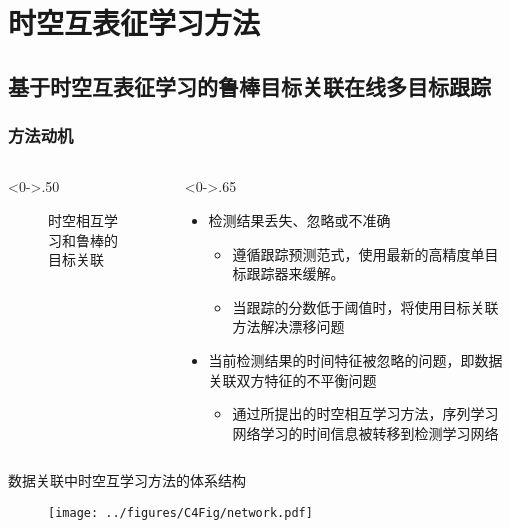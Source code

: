 \section{时空互表征学习方法}
\subsection{基于时空互表征学习的鲁棒目标关联在线多目标跟踪}


\begin{frame}
	\frametitle{方法动机}
	\begin{columns}[T] %
		\begin{column}<0->{.50\textwidth}
			\begin{figure}[thpb]
				\centering
				\caption{时空相互学习和鲁棒的目标关联}
			\end{figure}
		\end{column}
		\hfill%
		\begin{column}<0->{.65\textwidth}
			\begin{itemize}
				\item<1-> 检测结果丢失、忽略或不准确
				\begin{itemize}
					\item<1-> 遵循跟踪预测范式，使用最新的高精度单目标跟踪器来缓解。
					\item<1-> 当跟踪的分数低于阈值时，将使用目标关联方法解决漂移问题
				\end{itemize}
				\item<1-> 当前检测结果的时间特征被忽略的问题，即数据关联双方特征的不平衡问题
				\begin{itemize}
					\item<1-> 通过所提出的时空相互学习方法，序列学习网络学习的时间信息被转移到检测学习网络
				\end{itemize}
			\end{itemize}
		\end{column}%
	\end{columns}
\end{frame}


\begin{frame}{数据关联中时空互学习方法的体系结构}
	\begin{figure}[!t]
		\centering
		\texttt{[image: ../figures/C4Fig/network.pdf]}
	\end{figure}
\end{frame}


